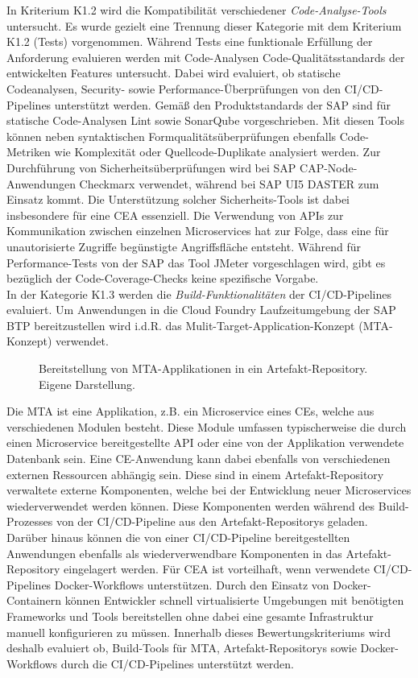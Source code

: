 In Kriterium K1.2 wird die Kompatibilität verschiedener \textit{Code-Analyse-Tools} untersucht. Es wurde gezielt eine Trennung dieser Kategorie mit dem Kriterium K1.2 (Tests) vorgenommen. Während Tests eine funktionale Erfüllung der Anforderung evaluieren werden mit Code-Analysen Code-Qualitätsstandards der entwickelten Features untersucht. Dabei wird evaluiert, ob statische Codeanalysen, Security- sowie Performance-Überprüfungen von den CI/CD-Pipelines unterstützt werden. Gemäß den Produktstandards der SAP sind für statische Code-Analysen Lint sowie SonarQube vorgeschrieben. Mit diesen Tools können neben syntaktischen Formqualitätsüberprüfungen ebenfalls Code-Metriken wie Komplexität oder Quellcode-Duplikate analysiert werden. Zur Durchführung von Sicherheitsüberprüfungen wird bei SAP CAP-Node-Anwendungen Checkmarx verwendet, während bei SAP UI5 DASTER zum Einsatz kommt. Die Unterstützung solcher Sicherheits-Tools ist dabei insbesondere für eine CEA essenziell. Die Verwendung von APIs zur Kommunikation zwischen einzelnen Microservices hat zur Folge, dass eine für unautorisierte Zugriffe begünstigte Angriffsfläche entsteht. Während für Performance-Tests von der SAP das Tool JMeter vorgeschlagen wird, gibt es bezüglich der Code-Coverage-Checks keine spezifische Vorgabe.\\
In der Kategorie K1.3 werden die \textit{Build-Funktionalitäten} der CI/CD-Pipelines evaluiert. 
Um Anwendungen in die Cloud Foundry Laufzeitumgebung der SAP BTP bereitzustellen wird i.d.R. das Mulit-Target-Application-Konzept (MTA-Konzept) verwendet.
\begin{center}
	\begin{figure}[H]
		\centering
		\caption[Bereitstellung von MTA-Applikationen in ein Artefakt-Repository]{Bereitstellung von MTA-Applikationen in ein Artefakt-Repository. Eigene Darstellung.}
		\label{fig:MTA}
	\end{figure}
\end{center}
\vspace*{-10mm}
Die MTA ist eine Applikation, z.B. ein Microservice eines CEs, welche aus verschiedenen Modulen besteht. Diese Module umfassen typischerweise die durch einen Microservice bereitgestellte API oder eine von der Applikation verwendete Datenbank sein. Eine CE-Anwendung kann dabei ebenfalls von verschiedenen externen Ressourcen abhängig sein. Diese sind in einem Artefakt-Repository verwaltete externe Komponenten, welche bei der Entwicklung neuer Microservices wiederverwendet werden können. Diese Komponenten werden während des Build-Prozesses von der CI/CD-Pipeline aus den Artefakt-Repositorys geladen. Darüber hinaus können die von einer CI/CD-Pipeline bereitgestellten Anwendungen ebenfalls als wiederverwendbare Komponenten in das  Artefakt-Repository eingelagert werden. Für CEA ist vorteilhaft, wenn verwendete CI/CD-Pipelines Docker-Workflows unterstützen. Durch den Einsatz von Docker-Containern können Entwickler schnell virtualisierte Umgebungen mit benötigten Frameworks und Tools bereitstellen ohne dabei eine gesamte Infrastruktur manuell konfigurieren zu müssen. Innerhalb dieses Bewertungskriteriums wird deshalb evaluiert ob, Build-Tools für MTA, Artefakt-Repositorys sowie Docker-Workflows durch die CI/CD-Pipelines unterstützt werden.\\
